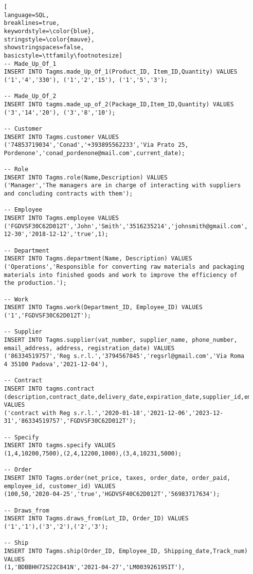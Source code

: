 \begin{lstlisting}[
language=SQL,
breaklines=true,
keywordstyle=\color{blue},
stringstyle=\color{mauve},
showstringspaces=false,
basicstyle=\ttfamily\footnotesize]
-- Made_Up_Of_1
INSERT INTO Tagms.made_Up_Of_1(Product_ID, Item_ID,Quantity) VALUES
('1','4','330'), ('1','2','15'), ('1','5','3');

-- Made_Up_Of_2
INSERT INTO tagms.made_up_of_2(Package_ID,Item_ID,Quantity) VALUES
('3','14','20'), ('3','8','10');

-- Customer
INSERT INTO Tagms.customer VALUES
('74853719034','Conad','+393895562233','Via Prato 25, Pordenone','conad_pordenone@mail.com',current_date);

-- Role
INSERT INTO Tagms.role(Name,Description) VALUES
('Manager','The managers are in charge of interacting with suppliers and concluding contracts with them');

-- Employee
INSERT INTO Tagms.employee VALUES
('FGDVSF30C62D012T','John','Smith','3516235214','johnsmith@gmail.com','1995-12-30','2018-12-12','true',1);

-- Department
INSERT INTO Tagms.department(Name, Description) VALUES
('Operations','Responsible for converting raw materials and packaging materials into finished goods and work to improve the efficiency of the production.');

-- Work
INSERT INTO Tagms.work(Department_ID, Employee_ID) VALUES
('1','FGDVSF30C62D012T');

-- Supplier
INSERT INTO Tagms.supplier(vat_number, supplier_name, phone_number, email_address, address, registration_date) VALUES
('86334519757','Reg s.r.l.','3794567845','regsrl@gmail.com','Via Roma 4 35100 Padova','2021-12-04'),

-- Contract
INSERT INTO tagms.contract (description,contract_date,delivery_date,expiration_date,supplier_id,employee_id) VALUES
('contract with Reg s.r.l.','2020-01-18','2021-12-06','2023-12-31','86334519757','FGDVSF30C62D012T');

-- Specify
INSERT INTO tagms.specify VALUES
(1,4,10200,7500),(2,4,12200,1000),(3,4,10231,5000);

-- Order
INSERT INTO Tagms.order(net_price, taxes, order_date, order_paid, employee_id, customer_id) VALUES
(100,50,'2020-04-25','true','HGDVSF40C62D012T','56983717634');

-- Draws_from
INSERT INTO Tagms.draws_from(Lot_ID, Order_ID) VALUES
('1','1'),('3','2'),('2','3');

-- Ship
INSERT INTO Tagms.ship(Order_ID, Employee_ID, Shipping_date,Track_num) VALUES
(1,'BDBBHH72S22C841N','2021-04-27','LM003926195IT'),































\end{lstlisting}
